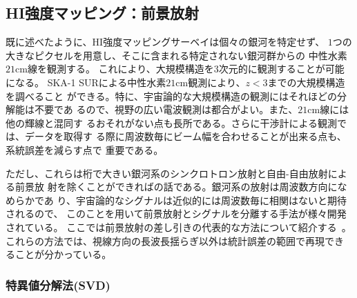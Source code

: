 \subsection{HI強度マッピング：前景放射}\label{cosmology.s2.ss3}

既に述べたように、HI強度マッピングサーベイは個々の銀河を特定せず、
$1$つの大きなピクセルを用意し、そこに含まれる特定されない銀河群からの
中性水素$21$cm線を観測する。
これにより、大規模構造を$3$次元的に観測することが可能になる。
SKA-1 SURによる中性水素$21$cm観測により、$z<3$までの大規模構造を調べること
ができる。特に、宇宙論的な大規模構造の観測にはそれほどの分解能は不要であ
るので、視野の広い電波観測は都合がよい。また、$21$cm線には他の輝線と混同す
るおそれがない点も長所である。さらに干渉計による観測では、データを取得す
る際に周波数毎にビーム幅を合わせることが出来る点も、系統誤差を減らす点で
重要である。

ただし、これらは桁で大きい銀河系のシンクロトロン放射と自由-自由放射による前景放
射を除くことができればの話である。銀河系の放射は周波数方向になめらかであ
り、宇宙論的なシグナルは近似的には周波数毎に相関はないと期待されるので、
このことを用いて前景放射とシグナルを分離する手法が様々開発されている。
ここでは前景放射の差し引きの代表的な方法について紹介する~\citep{Wolz:2015sqa}。
これらの方法では、視線方向の長波長揺らぎ以外は統計誤差の範囲で再現でき
ることが分かっている。

\subsubsection{特異値分解法(SVD)}

